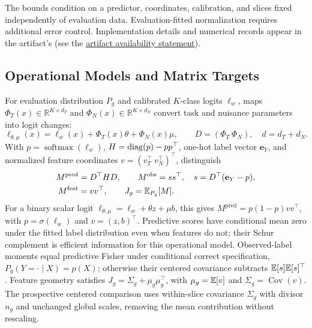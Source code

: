 The bounds condition on a predictor, coordinates, calibration, and slices fixed independently of evaluation data. Evaluation-fitted normalization requires additional error control. Implementation details and numerical records appear in the artifact's  (see the \hyperref[sec:artifact-availability]{artifact availability statement}).

\subsection{Operational Models and Matrix Targets}
\label{app:operational-matrices}
For evaluation distribution $P_g$ and calibrated $K$-class logits $\ell_w$, maps $\Phi_T(x)\in\mathbb R^{K\times d_T}$ and $\Phi_N(x)\in\mathbb R^{K\times d_N}$ convert task and nuisance parameters into logit changes:
\begin{equation}
\ell_{\theta,\mu}(x)=\ell_w(x)+\Phi_T(x)\theta+\Phi_N(x)\mu,
\qquad D=(\Phi_T\ \Phi_N),\quad d=d_T+d_N.
\label{eq:operational-perturbations}
\end{equation}
With $p=\operatorname{softmax}(\ell_w)$, $H=\operatorname{diag}(p)-pp^\top$, one-hot label vector $\mathbf e_Y$, and normalized feature coordinates $v=(v_T^\top\ v_N^\top)^\top$, distinguish
\begin{equation}
\begin{aligned}
M^{\mathrm{pred}}&=D^\top HD,\qquad M^{\mathrm{obs}}=ss^\top,
\quad s=D^\top(\mathbf e_Y-p),\\
M^{\mathrm{feat}}&=vv^\top,\qquad J_g=\mathbb{E}_{P_g}[M].
\end{aligned}
\label{eq:appB-matrix-targets}
\end{equation}
For a binary scalar logit $\ell_{\theta,\mu}=\ell_w+\theta z+\mu b$, this gives $M^{\mathrm{pred}}=p(1-p)vv^\top$, with $p=\sigma(\ell_w)$ and $v=(z,b)^\top$. Predictive scores have conditional mean zero under the fitted label distribution even when features do not; their Schur complement is efficient information for this operational model. Observed-label moments equal predictive Fisher under conditional correct specification, $P_g(Y=\cdot\mid X)=p(X)$; otherwise their centered covariance subtracts $\mathbb{E}[s]\mathbb{E}[s]^\top$. Feature geometry satisfies $J_g=\Sigma_g+\mu_g\mu_g^\top$, with $\mu_g=\mathbb{E}[v]$ and $\Sigma_g=\operatorname{Cov}(v)$. The prospective centered comparison uses within-slice covariance $\Sigma_g$ with divisor $n_g$ and unchanged global scales, removing the mean contribution without rescaling.

